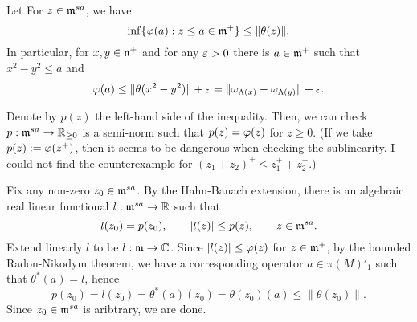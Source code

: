 \documentclass{../../small}
\begin{document}
\begin{lem}
Let 
For $z\in\mathfrak{m}^{sa}$, we have
\[\inf\{\varphi(a):z\le a\in\mathfrak{m}^+\}\le\|\theta(z)\|.\]
In particular, for $x,y\in\mathfrak{n}^+$ and for any $\varepsilon>0$ there is $a\in\mathfrak{m}^+$ such that $x^2-y^2\le a$ and
\[\varphi(a)\le\|\theta(x^2-y^2)\|+\varepsilon=\|\omega_{\Lambda(x)}-\omega_{\Lambda(y)}\|+\varepsilon.\]
\end{lem}
\begin{pf}
Denote by $p(z)$ the left-hand side of the inequality.
Then, we can check $p:\mathfrak{m}^{sa}\to\mathbb{R}_{\ge0}$ is a semi-norm such that $p(z)=\varphi(z)$ for $z\ge0$.
(If we take $p(z):=\varphi(z^+)$, then it seems to be dangerous when checking the sublinearity. I could not find the counterexample for $(z_1+z_2)^+\le z_1^++z_2^+$.)

Fix any non-zero $z_0\in\mathfrak{m}^{sa}$.
By the Hahn-Banach extension, there is an algebraic real linear functional $l:\mathfrak{m}^{sa}\to\mathbb{R}$ such that
\[l(z_0)=p(z_0),\qquad |l(z)|\le p(z),\qquad z\in\mathfrak{m}^{sa}.\]
Extend linearly $l$ to be $l:\mathfrak{m}\to\mathbb{C}$.
Since $|l(z)|\le\varphi(z)$ for $z\in\mathfrak{m}^+$, by the bounded Radon-Nikodym theorem, we have a corresponding operator $a\in\pi(M)'_1$ such that $\theta^*(a)=l$, hence
\[p(z_0)=l(z_0)=\theta^*(a)(z_0)=\theta(z_0)(a)\le\|\theta(z_0)\|.\]
Since $z_0\in\mathfrak{m}^{sa}$ is aribtrary, we are done.
\end{pf}
\end{document}
